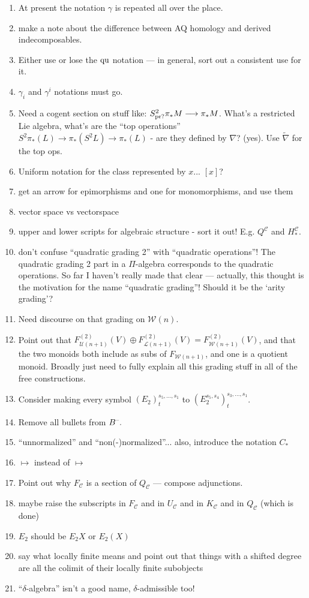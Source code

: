 \documentclass[11pt]{amsart}
\theoremstyle{plain}
\theoremstyle{definition}
\newcommand{\DASH}{\textup{--}}
\renewcommand{\to}{\longrightarrow}
\newcommand{\calW}{\mathcal{W}}
\newcommand{\calU}{\mathcal{U}}
\newcommand{\calL}{\mathcal{L}}
\newcommand{\calC}{\mathcal{C}}
\theoremstyle{plain}
\newcommand{\quadratic}{\textup{qu}}
\begin{document}
\begin{todolist}
\begin{enumerate}
\item At present the notation $\gamma$ is repeated all over the place.
\item make a note about the difference between AQ homology and derived indecomposables.
\item Either use or lose the $\quadratic$ notation --- in general, sort out a consistent use for it.
\item $\gamma_i$ and $\gamma^i$ notations must go.
\item Need a cogent section on stuff like: $S^2_\textup{pr?}\pi_*M\to \pi_*M$. What's a restricted Lie algebra, what's are the ``top operations'' $S^2\pi_*(L)\to \pi_*(S^2L)\to \pi_*(L)$ - are they defined by $\nabla$? (yes). Use $\widetilde{\nabla}$ for the top ops.
\item Uniform notation for the class represented by $x$... $[x]$?
\item get an arrow for epimorphisms and one for monomorphisms, and use them
\item vector space vs vectorspace
\item upper and lower scripts for algebraic structure - sort it out! E.g. $Q^\calC$ and $H_*^\calC$.
\item don't confuse ``quadratic grading 2'' with ``quadratic operations''! The quadratic grading 2 part in a $\Pi$-algebra corresponds to the quadratic operations. So far I haven't really made that clear --- actually, this thought is the motivation for the name ``quadratic grading''! Should it be the `arity grading'?
\item Need discourse on that grading on $\calW(n)$.
\item Point out that $F_{\calU(n+1)}^{(2)}(V)\oplus F_{\calL(n+1)}^{(2)}(V)=F_{\calW(n+1)}^{(2)}(V)$, and that the two monoids both include as subs of $F_{\calW(n+1)}$, and one is a quotient monoid. Broadly just need to fully explain all this grading stuff in all of the free constructions.
\item Consider making every symbol $(E_2)^{s_5,\ldots,s_1}_t$ to $(E_2^{s_5,s_4})^{s_3,\ldots,s_1}_t$.
\item Remove all bullets from $B^{\DASH}.$
\item ``unnormalized'' and ``non(-)normalized''... also, introduce the notation $C_*$
\item $\longmapsto$ instead of $\mapsto$
\item Point out why $F_\calC$ is a section of $Q_{\calC}$ --- compose adjunctions.
\item maybe raise the subscripts in $F_\calC$ and in $U_\calC$ and in $K_\calC$ and in $Q_\calC$ (which is done)
\item $E_2$ should be $E_2X$ or $E_2(X)$
\item say what locally finite means and point out that things with a shifted degree are all the colimit of their locally finite subobjects
\item ``$\delta$-algebra'' isn't a good name, $\delta$-admissible too!
\end{enumerate}
\end{todolist}
\end{document}

